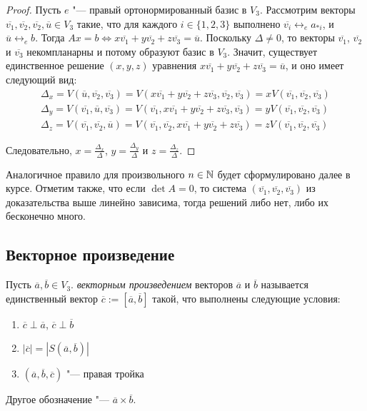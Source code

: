 \begin{proof}
	Пусть $e$ "--- правый ортонормированный базис в $V_3$. Рассмотрим векторы $\overline{v_1}, \overline{v_2}, \overline{v_2}, \overline{u} \in V_3$ такие, что для каждого $i \in \{1, 2, 3\}$ выполнено $\overline{v_i} \leftrightarrow_{e} a_{*i}$, и $\overline{u} \leftrightarrow_{e} b$. Тогда $Ax = b \Leftrightarrow x\overline{v_1} + y\overline{v_2} + z\overline{v_3} = \overline{u}$. Поскольку $\Delta \ne 0$, то векторы $\overline{v_1}$, $\overline{v_2}$ и $\overline{v_3}$ некомпланарны и потому образуют базис в $V_3$. Значит, существует единственное решение $(x, y, z)$ уравнения $x\overline{v_1} + y\overline{v_2} + z\overline{v_3} = \overline{u}$, и оно имеет следующий вид:
	\begin{gather*}
	\Delta_x = V(\overline{u}, \overline{v_2}, \overline{v_3}) = V(x\overline{v_1} + y\overline{v_2} + z\overline{v_3}, \overline{v_2}, \overline{v_3}) = xV(\overline{v_1}, \overline{v_2}, \overline{v_3})\\
	\Delta_y = V(\overline{v_1}, \overline{u}, \overline{v_3}) = V(\overline{v_1}, x\overline{v_1} + y\overline{v_2} + z\overline{v_3}, \overline{v_3}) = yV(\overline{v_1}, \overline{v_2}, \overline{v_3})\\
	\Delta_z = V(\overline{v_1}, \overline{v_2}, \overline{u}) = V(\overline{v_1}, \overline{v_2}, x\overline{v_1} + y\overline{v_2} + z\overline{v_3}) = zV(\overline{v_1}, \overline{v_2}, \overline{v_3})
	\end{gather*}
	
	Следовательно, $x = \frac{\Delta_x}{\Delta}$, $y = \frac{\Delta_y}{\Delta}$ и $z = \frac{\Delta_z}{\Delta}$.
\end{proof}

\begin{note}
	Аналогичное правило для произвольного $n \in \mathbb{N}$ будет сформулировано далее в курсе. Отметим также, что если $\det{A} = 0$, то система $(\overline{v_1}, \overline{v_2}, \overline{v_3})$ из доказательства выше линейно зависима, тогда решений либо нет, либо их бесконечно много.
\end{note}

\subsection{Векторное произведение}

\begin{definition}
	Пусть $\overline{a}, \overline{b} \in V_3$. \textit{векторным произведением} векторов $\overline{a}$ и $\overline{b}$ называется единственный вектор $\overline{c} := [\overline{a}, \overline{b}]$ такой, что выполнены следующие условия:
	\begin{enumerate}
		\item $\overline{c} \perp \overline{a}$, $\overline{c} \perp \overline{b}$
		\item $|\overline{c}| = |S(\overline{a}, \overline{b})|$
		\item $(\overline{a}, \overline{b}, \overline{c})$ "--- правая тройка
	\end{enumerate}
	
	Другое обозначение "--- $\overline{a} \times \overline{b}$.
\end{definition}

